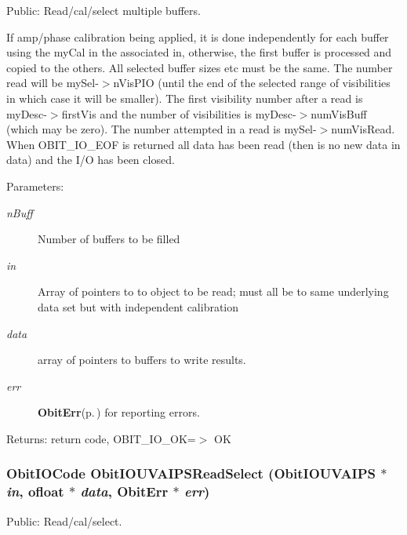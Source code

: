 Public: Read/cal/select multiple buffers. 

If amp/phase calibration being applied, it is done independently for each buffer using the my\-Cal in the associated in, otherwise, the first buffer is processed and copied to the others. All selected buffer sizes etc must be the same. The number read will be my\-Sel-$>$n\-Vis\-PIO (until the end of the selected range of visibilities in which case it will be smaller). The first visibility number after a read is my\-Desc-$>$first\-Vis and the number of visibilities is my\-Desc-$>$num\-Vis\-Buff (which may be zero). The number attempted in a read is my\-Sel-$>$num\-Vis\-Read. When OBIT\_\-IO\_\-EOF is returned all data has been read (then is no new data in data) and the I/O has been closed. \begin{Desc}
\item[Parameters:]
\begin{description}
\item[{\em n\-Buff}]Number of buffers to be filled \item[{\em in}]Array of pointers to to object to be read; must all be to same underlying data set but with independent calibration \item[{\em data}]array of pointers to buffers to write results. \item[{\em err}]{\bf Obit\-Err}{\rm (p.\,\pageref{structObitErr})} for reporting errors. \end{description}
\end{Desc}
\begin{Desc}
\item[Returns:]return code, OBIT\_\-IO\_\-OK=$>$ OK \end{Desc}
\subsubsection{\setlength{\rightskip}{0pt plus 5cm}Obit\-IOCode Obit\-IOUVAIPSRead\-Select ({\bf Obit\-IOUVAIPS} $\ast$ {\em in}, {\bf ofloat} $\ast$ {\em data}, {\bf Obit\-Err} $\ast$ {\em err})}\label{ObitIOUVAIPS_8h_a14}


Public: Read/cal/select. 

